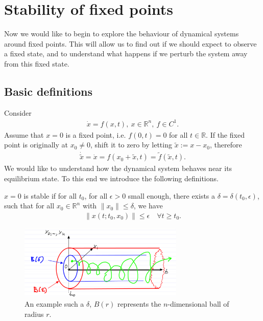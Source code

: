 \chapter{Stability of fixed points}
Now we would like to begin to explore the behaviour of dynamical systems around fixed points. This will allow us to find out if we should expect to observe a fixed state, and to understand what happens if we perturb the system away from this fixed state.
\section{Basic definitions}
Consider
\begin{align}
	\dot{ {x}}=f( {x},t),\  {x} \in \mathbb{R}^{n},\ f\in C^{1}.
\end{align}
Assume that $ {x}=0$ is a fixed point, i.e. $f({0},t) = {0}$ for all $t \in \mathbb{R}$. If the fixed point is originally at ${x}_0\neq {0}$, shift it to zero by letting $\tilde{ {x}}:= {x}- {x}_0$, therefore 
\begin{align}
	\dot{\tilde{ {x}}} = \dot{ {x}} = f( {x}_0 + \tilde{ {x}}, t) = \tilde{f}(\tilde{ {x}}, t).
\end{align}
We would like to understand how the dynamical system behaves near its equilibrium state. To this end we introduce the following definitions.
\begin{definition}
	$ {x}={0}$ is stable if for all $t_0$, for all $\epsilon>0$ small enough, there exists a $\delta=\delta(t_0, \epsilon)$, such that for all $ {x}_0 \in \mathbb{R}^{n}$ with $\| {x}_0\| \leq \delta$, we have 
	\begin{align}
		\left \|  {x}(t;t_0,  {x}_0) \right\| \leq \epsilon \quad \forall t \geq t_0.
	\end{align}
\begin{figure}[h!]
	\centering
	\includegraphics[width=0.7\textwidth]{figures/ch2/1lyapunov_stability.png}
	\caption{An example such a $\delta$, $B(r)$ represents the $n$-dimensional ball of radius $r$.}
	\label{fig:lyapunov_stability_def}
\end{figure}
\end{definition}

